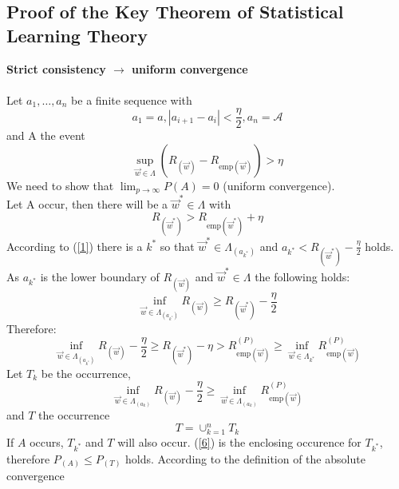 \subsection{Proof of the Key Theorem of Statistical Learning Theory}
{\bf Strict consistency $\rightarrow$ uniform convergence}
\\\\
\noindent Let $a_1, \ldots, a_n$ be a finite sequence with
\begin{equation} \label{1}
	a_1 	= a, |a_{i+1}-a_i|< \frac{\eta}{2}, a_n 
		= \mathcal A
\end{equation}
and A the event
\[ \sup_{ \vec{w} \in \Lambda }
	(R_{ (\vec{w}) } - R_{ \mathrm{emp}(\vec{w}) }) > \eta 
\]
We need to show that $\lim_{p \rightarrow \infty} P(A) = 0$ (uniform convergence).\\
Let A occur, then there will be a $\vec{w}^* \in \Lambda$ with
\begin{equation} \label{2}
	R_{ (\vec{w}^*) } > R_{ \mathrm{emp}(\vec{w}^*) } + \eta
\end{equation}
According to (\ref{1}) there is a $k^*$ so that $\vec{w}^* \in \Lambda_{(a_{k^*})}$ and $a_{k^*} < R_{ (\vec{w}^*) } -\frac{\eta}{2}$ holds. As $a_{k^*}$ is the lower boundary of $R_{ (\vec{w}) }$ and $\vec{w}^* \in \Lambda$ the following holds:
\begin{equation} \label{3}
	\inf_{ \vec{w} \in \Lambda_{ (a_{k^*}) } } R_{ (\vec{w}) } 
	\geq R_{ (\vec{w}^*) } -\frac{\eta}{2}	
\end{equation}
Therefore:
\begin{equation} \label{4}
	\inf_{ \vec{w} \in \Lambda_{ (a_{k^*}) } } 
	R_{ (\vec{w}) } -\frac{\eta}{2}
	\geq R_{ (\vec{w}^*) } -\eta
	> R_{ \mathrm{emp}(\vec{w}) }^{(P)}
	\geq \inf_{ \vec{w} \in \Lambda_{ k^* } } 
		R_{ \mathrm{emp}( \vec{w}) }^{(P)}
\end{equation}
Let $T_k$ be the occurrence,
\begin{equation} \label{5}
	\inf_{ \vec{w} \in \Lambda_{ (a_{k}) } } 
		R_{ (\vec{w}) } 
		-\frac{\eta}{2}
	\geq \inf_{ \vec{w} \in \Lambda_{ (a_{k}) } }
		R_{ \mathrm{emp}(\vec{w}) }^{(P)}
\end{equation}
and $T$ the occurrence
\begin{equation} \label{6}
	T = \cup_{k=1}^n T_k
\end{equation}
If $A$ occurs, $T_{k^*}$ and $T$ will also occur. (\ref{6}) is the enclosing occurence for $T_{k^*}$, therefore $P_{(A)} \leq P_{(T)}$ holds.
According to the definition of the absolute convergence
